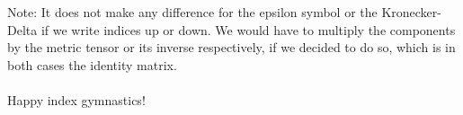 \documentclass[11pt, oneside]{article}   	%
\begin{document}
Note: It does not make any difference for the epsilon symbol or the Kronecker-Delta if we 
write indices up or down. We would have to multiply the components by the metric tensor or 
its inverse respectively, if we decided to do so, which is in both cases the identity matrix.
\paragraph{}
Happy index gymnastics!
\end{document}
